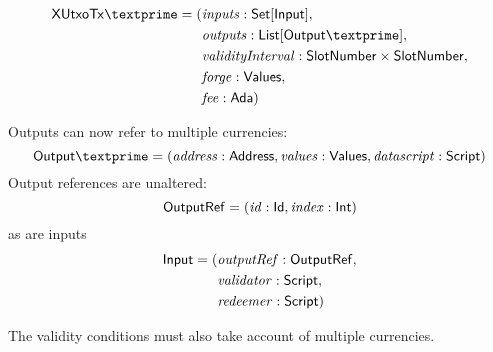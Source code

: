 \documentclass[a4paper]{article}
\theoremstyle{definition}  %
\begin{document}
  \begin{align*}
    \xutox\textprime = ( &\inputs: \mathsf{Set[Input]},\\
    &\outputs: \mathsf{List[Output\textprime]},\\
    &\mathit{validityInterval}: \slotnum \times \slotnum,\\
    &\forge: \mathsf{Values}, \\
    &\fee: \mathsf{Ada})\\
  \end{align*}

\noindent Outputs can now refer to multiple currencies:
  \[
      \mathsf{Output\textprime} = (\addr: \mathsf{Address}, \vals: \mathsf{Values}, \mi{datascript}: \mathsf{Script})
    \]
  Output references are unaltered:
  \[
    \mathsf{OutputRef} = (\mathit{id}: \mathsf{Id}, \mathit{index}: \mathsf{Int})
  \]
  as are inputs
  \begin{align*}
    \mathsf{Input} = (& \mathit{outputRef}: \mathsf{OutputRef},\\
                      & \mathit{validator}: \mathsf{Script},\\
                      & \mathit{redeemer}: \mathsf{Script})\\
  \end{align*}


  
\noindent The validity conditions must also take account of 
multiple currencies.
\end{document}
